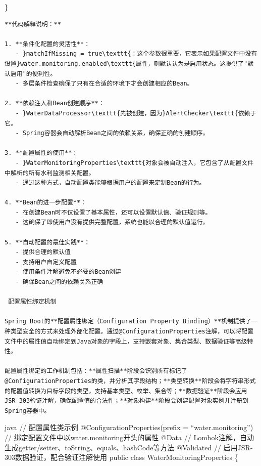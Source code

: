 \}

\begin{lstlisting}
**代码解释说明：**

1. **条件化配置的灵活性**：
   - }matchIfMissing = true\texttt{：这个参数很重要，它表示如果配置文件中没有设置}water.monitoring.enabled\texttt{属性，则默认认为是启用状态。这提供了"默认启用"的便利性。
   - 多层条件检查确保了只有在合适的环境下才会创建相应的Bean。

2. **依赖注入和Bean创建顺序**：
   - }WaterDataProcessor\texttt{先被创建，因为}AlertChecker\texttt{依赖于它。
   - Spring容器会自动解析Bean之间的依赖关系，确保正确的创建顺序。

3. **配置属性的使用**：
   - }WaterMonitoringProperties\texttt{对象会被自动注入，它包含了从配置文件中解析的所有水利监测相关配置。
   - 通过这种方式，自动配置类能够根据用户的配置来定制Bean的行为。

4. **Bean的进一步配置**：
   - 在创建Bean时不仅设置了基本属性，还可以设置默认值、验证规则等。
   - 这确保了即使用户没有提供完整配置，系统也能以合理的默认值运行。

5. **自动配置的最佳实践**：
   - 提供合理的默认值
   - 支持用户自定义配置
   - 使用条件注解避免不必要的Bean创建
   - 确保Bean之间的依赖关系正确

 配置属性绑定机制

Spring Boot的**配置属性绑定（Configuration Property Binding）**机制提供了一种类型安全的方式来处理外部化配置。通过@ConfigurationProperties注解，可以将配置文件中的属性值自动绑定到Java对象的字段上，支持嵌套对象、集合类型、数据验证等高级特性。

配置属性绑定的工作机制包括：**属性扫描**阶段会识别所有标记了@ConfigurationProperties的类，并分析其字段结构；**类型转换**阶段会将字符串形式的配置值转换为目标字段的类型，支持基本类型、枚举、集合等；**数据验证**阶段会应用JSR-303验证注解，确保配置值的合法性；**对象构建**阶段会创建配置对象实例并注册到Spring容器中。
\end{lstlisting}

java // 配置属性类示例 @ConfigurationProperties(prefix = ``water.monitoring'') // 绑定配置文件中以water.monitoring开头的属性 @Data // Lombok注解，自动生成getter/setter、toString、equals、hashCode等方法 @Validated // 启用JSR-303数据验证，配合验证注解使用 public class WaterMonitoringProperties \{

